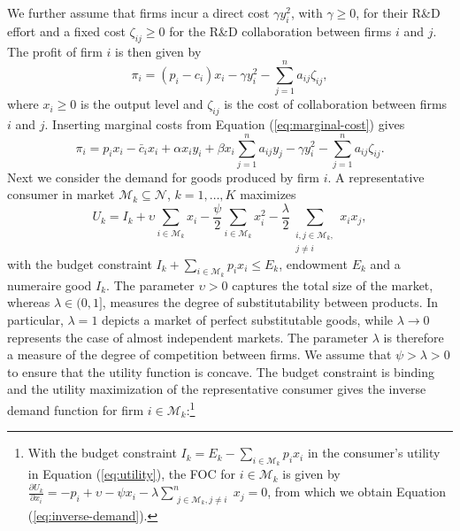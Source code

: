 We further assume that firms incur a direct cost $\gamma y_{i}^{2}$, with $\gamma \ge 0$, for their R\&D effort and a fixed cost $\zeta_{ij} \ge 0$ for the R\&D collaboration between firms $i$ and $j$. The profit of firm $i$ is then given by
\begin{equation}
\pi_i = (p_i - c_i)x_i - \gamma y_i^2 - \sum_{j=1}^n a_{ij} \zeta_{ij},
\label{eq:profit-cost}
\end{equation}
where $x_i \ge 0$ is the output level and $\zeta_{ij}$ is the cost of collaboration between firms $i$ and $j$. Inserting marginal costs from Equation (\ref{eq:marginal-cost}) gives
\begin{equation*}
\pi_i = p_i x_i - \bar{c}_i x_i + \alpha x_i y_i +
\beta x_i \sum_{j=1}^n a_{ij} y_j - \gamma y_i^2 - \sum_{j=1}^n a_{ij}\zeta_{ij}.
\end{equation*}
Next we consider the demand for goods produced by firm $i$. A representative
consumer in market $\mathcal{M}_k \subseteq \mathcal{N}$, $k=1,\ldots,K$ maximizes \citep{Singh1984}
\begin{equation}
U_k = I_k + \upsilon \sum_{i \in \mathcal{M}_k} x_i - \frac{\psi}{2} \sum_{i \in \mathcal{M}_k} x_i^2 - \frac{\lambda}{2} \sum_{\substack{i,j \in \mathcal{M}_k, \\ j \neq i}} x_i x_j,
\label{eq:utility}
\end{equation}
with the budget constraint $I_k + \sum_{i \in \mathcal{M}_k} p_i x_i \le E_k$, endowment $E_k$ and a numeraire good $I_k$. The parameter $\upsilon>0$ captures the total
size of the market, whereas $\lambda \in (0,1]$, measures the degree of
substitutability between products. In particular, $\lambda = 1$ depicts a market
of perfect substitutable goods, while $\lambda \to 0$ represents the
case of almost independent markets. %
The parameter $\lambda$ is therefore a measure of the degree of competition between firms. We assume that $\psi>\lambda>0$ to ensure that the utility function is concave. The budget constraint is binding and the utility maximization of the representative
consumer gives the inverse demand function for firm $i \in \mathcal{M}_k$:\footnote{With the budget constraint $I_k = E_k - \sum_{i \in \mathcal{M}_k} p_i x_i$ in the consumer's utility in Equation (\ref{eq:utility}), the FOC for $i \in \mathcal{M}_k$ is given by $\frac{\partial U_k}{\partial x_i} = - p_i + \upsilon - \psi x_i - \lambda \sum_{\substack{j \in \mathcal{M}_k, j \neq i}} ^n x_j = 0$, from which we obtain Equation (\ref{eq:inverse-demand}).}
